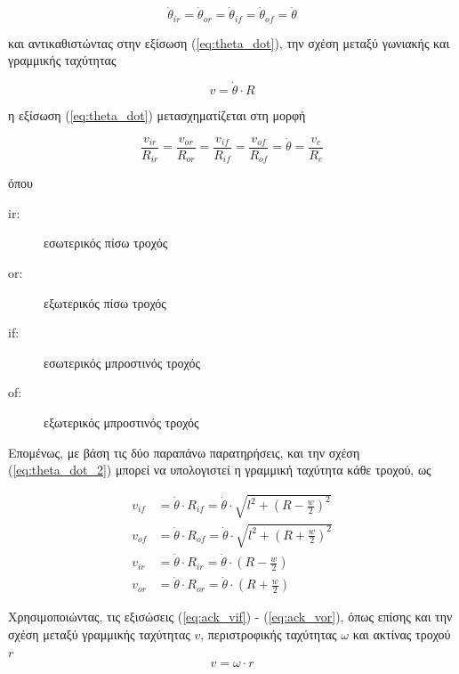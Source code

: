 \begin{equation}
	\dot\theta_{ir} = \dot\theta_{or} = \dot\theta_{if} = \dot\theta_{of} = \dot\theta
	\label{eq:theta_dot}
\end{equation}

\bigskip
\noindent
και αντικαθιστώντας στην εξίσωση (\ref{eq:theta_dot}), την σχέση μεταξύ γωνιακής και γραμμικής ταχύτητας
	
\begin{equation}
	v = \dot\theta \cdot R
	\label{eq:v_theta}
\end{equation}	

\noindent
η εξίσωση (\ref{eq:theta_dot}) μετασχηματίζεται στη μορφή
	
\begin{equation}	
	\frac{v_{ir}}{R_{ir}} = \frac{v_{or}}{R_{or}} = \frac{v_{if}}{R_{if}} = \frac{v_{of}}{R_{of}} = \dot\theta = \frac{v_c}{R_c}
	\label{eq:theta_dot_2}
\end{equation}

\noindent
όπου
\begin{description}
	\item[ir:] εσωτερικός πίσω τροχός
	\item[or:] εξωτερικός πίσω τροχός
	\item[if:] εσωτερικός μπροστινός τροχός
	\item[of:] εξωτερικός μπροστινός τροχός
\end{description}

\bigskip
Επομένως, με βάση τις δύο παραπάνω παρατηρήσεις, και την σχέση (\ref{eq:theta_dot_2}) μπορεί να υπολογιστεί η γραμμική ταχύτητα κάθε τροχού, ως

\begin{align}
	v_{if} &= \dot\theta \cdot R_{if} = \dot\theta \cdot \sqrt{l^2 + (R - \frac{w}{2})^2}
	\label{eq:ack_vif}\\
	v_{of} &= \dot\theta \cdot R_{of} = \dot\theta \cdot \sqrt{l^2 + (R + \frac{w}{2})^2}
	\label{eq:ack_vof}\\
	v_{ir} &= \dot\theta \cdot R_{ir} = \dot\theta \cdot (R - \frac{w}{2})
	\label{eq:ack_vir}\\
	v_{or} &= \dot\theta \cdot R_{or} = \dot\theta \cdot (R + \frac{w}{2})
	\label{eq:ack_vor}
\end{align}

\bigskip
Χρησιμοποιώντας, τις εξισώσεις (\ref{eq:ack_vif}) - (\ref{eq:ack_vor}), όπως επίσης και την σχέση μεταξύ γραμμικής ταχύτητας $v$, περιστροφικής ταχύτητας $\omega$ και ακτίνας τροχού $r$
\begin{equation}
	v = \omega \cdot r
	\label{eq:v_omega}
\end{equation}

